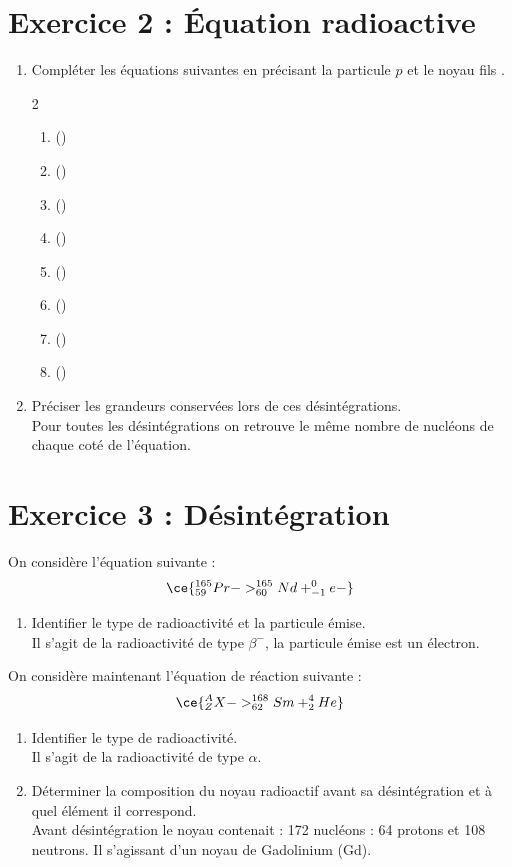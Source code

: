 \documentclass[a4paper,11pt,fleqn]{article}%
\begin{document}
\section*{Exercice 2 : Équation radioactive}
\begin{enumerate}
    \item Compléter les équations suivantes en précisant la particule $p$ et le noyau fils .
    \begin{multicols}{2}
    \begin{enumerate}
        \item (\ce{\beta +}) 
        \item (\ce{\gamma}) 
        \item (\ce{\beta -}) 
        \item (\ce{\gamma}) 
        \item (\ce{\beta -}) 
        \item (\ce{\alpha}) 
        \item (\ce{\alpha}) 
        \item (\ce{\beta +}) 
    \end{enumerate}
    \end{multicols}
    \item Préciser les grandeurs conservées lors de ces désintégrations.\\
    Pour toutes les désintégrations on retrouve le même nombre de nucléons de chaque coté de l'équation.
    \end{enumerate}
    
\section*{Exercice 3 : Désintégration}
On considère l'équation suivante :
$$\ce{^{165}_{59}Pr -> ^{165}_{60}Nd + ^0_{-1}e-}$$
\begin{enumerate}
    \item Identifier le type de radioactivité et la particule émise.\\
    Il s'agit de la radioactivité de type $\beta ^-$, la particule émise est un électron.
\end{enumerate}
On considère maintenant l'équation de réaction suivante :
$$\ce{^A_ZX -> ^{168}_{62}Sm + ^4_2He}$$
\begin{enumerate}[resume]
    \item Identifier le type de radioactivité.\\
    Il s'agit de la radioactivité de type $\alpha$.
    \item Déterminer la composition du noyau radioactif avant sa désintégration et à quel élément il correspond.\\
    Avant désintégration le noyau contenait : 172 nucléons : 64 protons et 108 neutrons. Il s'agissant d'un noyau de Gadolinium (Gd).
\end{enumerate}
\end{document}
